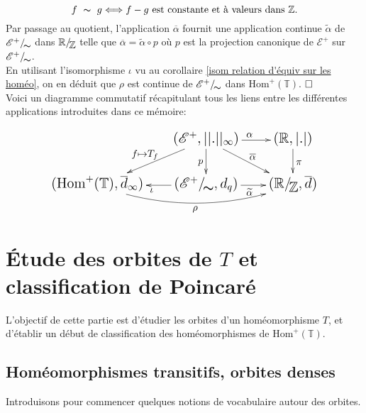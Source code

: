 \documentclass[11pt,a4 paper]{article}
\newcommand{\Tbb}{\mathbb{T}}
\newcommand{\Rbb}{\mathbb{R}}
\newcommand{\Zbb}{\mathbb{Z}}
\newcommand{\Ec}{\mathcal{E}}
\newcommand{\HomT}{\mathrm{Hom}^+(\Tbb)}
\newcommand*{\EnsembleQuotient}[2]%
{\ensuremath{%
		#1/\!\raisebox{-.65ex}{\ensuremath{\mathcal{#2}}}}}
\begin{document}
	$$f\ \thicksim\ g \Longleftrightarrow f-g \text{ est constante et à valeurs dans\ } \mathbb{Z}.$$
	Par passage au quotient, l'application $\overline{\alpha}$ fournit une application continue $\widetilde{\alpha}$ de $\EnsembleQuotient{\mathcal{E}^+}{\thicksim}$ dans $\EnsembleQuotient{\Rbb}{\mathbb{Z}}$ telle que $\overline{\alpha}=\widetilde{\alpha}\circ p$ où $p$ est la projection canonique de $\Ec^+$ sur  $\EnsembleQuotient{\mathcal{E}^+}{\thicksim}$.\\ En utilisant l'isomorphisme $\iota$ vu au corollaire \ref{isom relation d'équiv sur les homéo}, on en déduit que $\rho$ est continue de $\EnsembleQuotient{\mathcal{E}^+}{\thicksim}$ dans $\HomT$. $\hfill \square$\\
	
	
	

	
	
Voici un diagramme commutatif récapitulant tous les liens entre les différentes applications introduites dans ce mémoire:

$$\Large\xymatrix{
	&(\Ec^+,||.||_\infty) \ar[dl]_{f\mapsto T_f} \ar[r]^{\alpha} \ar[d]_p \ar[dr]^{\overline{\alpha}} & (\Rbb,|.|) \ar[d]^\pi\\
	(\HomT,\overline{d}_\infty)\ar@/_1.5pc/@{->}[rr]_\rho&(\EnsembleQuotient{\Ec^+}{\thicksim},d_q) \ar[l]^\iota \ar[r]_{\widetilde{\alpha}} & (\EnsembleQuotient{\Rbb}{\Zbb},\overline{d})}$$












\newpage	
	
\section{Étude des orbites de $T$ et classification de Poincaré}

L'objectif de cette partie est d'étudier les orbites d'un homéomorphisme $T$, et d'établir un début de classification des homéomorphismes de $\HomT$.

\subsection{Homéomorphismes transitifs, orbites denses}
Introduisons pour commencer quelques notions de vocabulaire autour des orbites.
\end{document}
